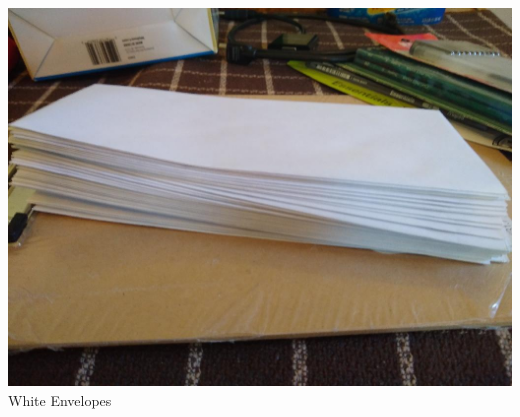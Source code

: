 \documentclass[t]{beamer}
\newcommand{\htarget}[2]{\hypertarget{#1}{#2}}
\begin{document}
\begin{frame}\htarget{envelopes}{} \begin{center}
\includegraphics[height=0.8\textheight]{white_envelope_mini.jpg} \\
White Envelopes
\end{center} \end{frame}
\end{document}
